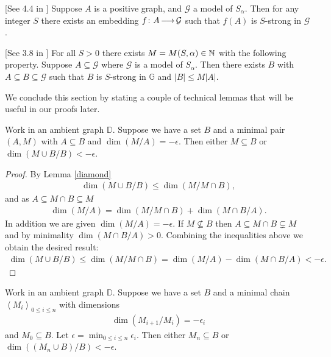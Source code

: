 \documentclass{amsart}
\newcommand{\GG}{\mathbb G}
\newcommand{\DB}{\mathbb D}
\newcommand{\G}{\mathcal G}
\newcommand{\agl}[1]{\left\langle #1 \right\rangle}
\begin{document}
\begin{Lemma} \label{las_str} [See 4.4 in \cite{laskowski}]
  Suppose $A$ is a positive graph, and $\G$ a model of $S_\alpha$.
  Then for any integer $S$ there exists an embedding $f \colon A \arr \G$ such that $f(A)$ is $S$-strong in $\G$.
\end{Lemma}
    
\begin{Lemma} \label{las_closure} [See 3.8 in \cite{laskowski}]
  For all $S > 0$ there exists $M = M(S, \alpha) \in \mathbb{N}$ with the following property.
  Suppose $A \subseteq \G$ where $\G$ is a model of $S_\alpha$.
  Then there exists $B$ with $A \subseteq B \subseteq \G$ such that $B$ is $S$-strong in $\GG$ and $|B| \leq M|A|$.
\end{Lemma}

We conclude this section by stating a couple of technical lemmas that will be useful in our proofs later.

\begin{Lemma} \label{minimal_over_set}
  Work in an ambient graph $\DB$.
  Suppose we have a set $B$ and a minimal pair $(A, M)$ with $A \subseteq B$ and $\dim(M/A) = -\epsilon$.
  Then either $M \subseteq B$ or $\dim(M \cup B/B) < -\epsilon$.
\end{Lemma}

\begin{proof}
  By Lemma \ref{diamond}
  \begin{align*}
    \dim(M \cup B/B) \leq \dim(M / M \cap B),
  \end{align*}
  and as $A \subseteq M \cap B \subseteq M$
  \begin{align*}
    \dim (M/A) = \dim(M / M \cap B) + \dim(M \cap B / A).
  \end{align*}
  In addition we are given $\dim (M/A) = -\epsilon$.
  If $M \not\subseteq B$ then $A \subseteq M \cap B \subsetneq M$ and by minimality $\dim(M \cap B / A) > 0$.
  Combining the inequalities above we obtain the desired result:
  \begin{align*}
    \dim(M \cup B/B) \leq \dim(M / M \cap B) = \dim (M/A) - \dim(M \cap B / A) < -\epsilon.
  \end{align*}
\end{proof}

\begin{Lemma}	\label{chain_lemma}
  Work in an ambient graph $\DB$.
  Suppose we have a set $B$ and a minimal chain  $\agl{M_i}_{0 \leq i \leq n}$ with dimensions
  \begin{align*}
    \dim(M_{i+1}/M_i) = -\epsilon_i
  \end{align*}
  and $M_0 \subseteq B$.
  Let $\epsilon = \min_{0 \leq i \leq n} \epsilon_i$.
  Then either $M_n \subseteq B$ or $\dim((M_n \cup B)/B) < -\epsilon$.
\end{Lemma}
\end{document}
